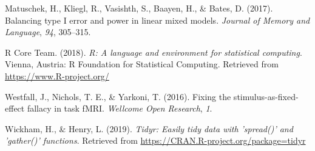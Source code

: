 \documentclass[doc,floatsintext]{apa6}
\begin{document}
\hypertarget{ref-matuschek_et_al_2017}{}
Matuschek, H., Kliegl, R., Vasishth, S., Baayen, H., \& Bates, D.
(2017). Balancing type I error and power in linear mixed models.
\emph{Journal of Memory and Language}, \emph{94}, 305--315.

\hypertarget{ref-R-base}{}
R Core Team. (2018). \emph{R: A language and environment for statistical
computing}. Vienna, Austria: R Foundation for Statistical Computing.
Retrieved from \url{https://www.R-project.org/}

\hypertarget{ref-westfall_yarkoni_2016}{}
Westfall, J., Nichols, T. E., \& Yarkoni, T. (2016). Fixing the
stimulus-as-fixed-effect fallacy in task fMRI. \emph{Wellcome Open
Research}, \emph{1}.

\hypertarget{ref-R-tidyr}{}
Wickham, H., \& Henry, L. (2019). \emph{Tidyr: Easily tidy data with
'spread()' and 'gather()' functions}. Retrieved from
\url{https://CRAN.R-project.org/package=tidyr}

\endgroup
\end{document}
